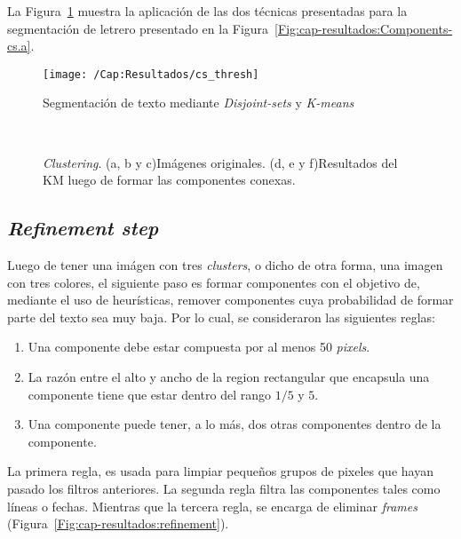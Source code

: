 La Figura~\ref{Fig:cap-resultados:thresh} muestra la aplicación de las dos 
técnicas presentadas para la segmentación de letrero presentado en la
Figura~\ref{Fig:cap-resultados:Components-cs.a}.
\begin{figure}[h!]
	\centering
	\texttt{[image: /Cap:Resultados/cs\_thresh]}
	\caption{Segmentación de texto mediante \textit{Disjoint-sets} y \textit{K-means}}
	\label{Fig:cap-resultados:thresh}
\end{figure}

\begin{figure}[h!]
  \centering
   { }
   { }
   \\
   { }
   { }
  \caption[\textit{Clustering}]{\textit{Clustering}. (a, b y c)Imágenes 
  originales. (d, e y f)Resultados del KM luego de formar las componentes
conexas.}
  \label{Fig:cap-resultados:km}
\end{figure}

\subsection{\textit{Refinement step}}
Luego de tener una imágen con tres \textit{clusters}, o dicho de otra forma,
una imagen con tres colores, el siguiente paso es formar componentes con el
objetivo de, mediante el uso de heurísticas, remover componentes cuya
probabilidad de formar parte del texto sea muy baja. Por lo cual, se
consideraron las siguientes reglas:
\begin{enumerate}
	\item Una componente debe estar compuesta por al menos 50 \textit{pixels}.
	\item La razón entre el alto y ancho de la region rectangular que encapsula 
	una componente tiene que estar dentro del rango $1/5$ y $5$.
	\item Una componente puede tener, a lo más, dos otras componentes dentro de 
	la componente.
\end{enumerate}

La primera regla, es usada para limpiar pequeños grupos de pixeles que hayan
pasado los filtros anteriores. La segunda regla filtra las componentes tales
como líneas o fechas. Mientras que la tercera regla, se encarga de eliminar
\textit{frames} (Figura~\ref{Fig:cap-resultados:refinement}).

